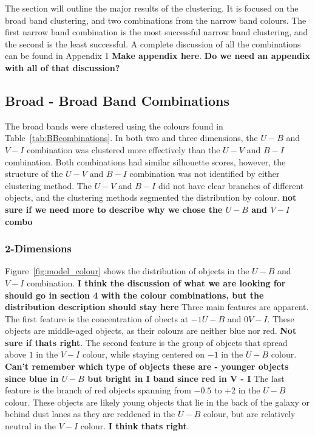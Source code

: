 
The section will outline the major results of the clustering. 
It is focused on the broad band clustering, and two combinations from the narrow band colours.
The first narrow band combination is the most successful narrow band clustering, and the second is the least successful.
A complete discussion of all the combinations can be found in Appendix 1 \textbf{Make appendix here}.
\textbf{Do we need an appendix with all of that discussion?}
%
%
%
%
%
%
%

\subsection{Broad - Broad Band Combinations}
The broad bands were clustered using the colours found in Table~\ref{tab:BBcombinations}.
In both two and three dimensions, the $U - B$ and $V - I$ combination was clustered more effectively than the $U - V$ and $B - I$ combination.
Both combinations had similar silhouette scores, however, the structure of the $U - V$ and $B - I$ combination was not identified by either clustering method. 
The $U - V$ and $B - I$ did not have clear branches of different objects, and the clustering methods segmented the distribution by colour.
\textbf{not sure if we need more to describe why we chose the $U - B$ and $V - I$ combo}

\subsubsection{2-Dimensions}
Figure~\ref{fig:model_colour} shows the distribution of objects in the $U - B$ and $V - I$ combination.
\textbf{I think the discussion of what we are looking for should go in section 4 with the colour combinations, but the distribution description should stay here}
Three main features are apparent.
The first feature is the concentration of obects at $-1 U - B$ and $0 V - I$.
These objects are middle-aged objects, as their colours are neither blue nor red. \textbf{Not sure if thats right}.
The second feature is the group of objects that spread above $1$ in the $V - I$ colour, while staying centered on $-1$ in the $U - B$ colour.
\textbf{Can't remember which type of objects these are - younger objects since blue in $U - B$ but bright in I band since red in V - I}
The last feature is the branch of red objects spanning from $-0.5$ to $+2$ in the $U - B$ colour.
These objects are likely young objects that lie in the back of the galaxy or behind dust lanes as they are reddened in the $U - B$ colour, but are relatively neutral in the $V - I$ colour. \textbf{I think thats right}. 

